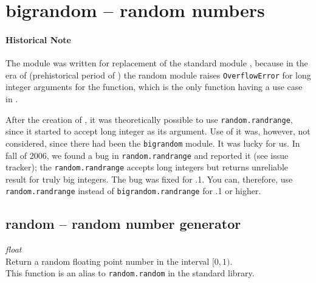 

 \section{bigrandom -- random numbers}
%
 \paragraph{Historical Note}\label{bigrandom_historical_note}

 The module was written for replacement of the \python standard module
 , because in the era of  (prehistorical period of
 \nzmath) the random module raises {\tt OverflowError} for long integer
 arguments for the  function, which is the only function
 having a use case in \nzmath.

 After the creation of , it was theoretically possible to
 use {\tt random.randrange}, since it started to accept long integer
 as its argument. Use of it was, however, not considered, since there
 had been the {\tt bigrandom} module. It was lucky for us. In fall of
 2006, we found a bug in {\tt random.randrange} and reported it (see
 issue tracker); the {\tt random.randrange} accepts long integers but
 returns unreliable result for truly big integers. The bug was fixed
 for .1. You can, therefore, use {\tt random.randrange}
 instead of {\tt bigrandom.randrange} for .1 or higher.

  \subsection{random -- random number generator}
   {}{{\em float}}\\
   \spacing
   \quad Return a random floating point number in the interval \([0, 1)\).\\
   \spacing
   \quad This function is an alias to {\tt random.random} in the \python standard library.\\
%
